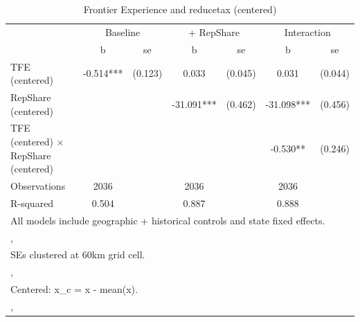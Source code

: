\begin{table}[htbp]\centering
\def\sym#1{\ifmmode^{#1}\else\(^{#1}\)\fi}
\caption{Frontier Experience and reducetax (centered)}
\begin{tabular}{l*{3}{cc}}
\toprule
                &\multicolumn{2}{c}{Baseline}&\multicolumn{2}{c}{ + RepShare}&\multicolumn{2}{c}{Interaction}\\
                &        b   &       se&        b   &       se&        b   &       se\\
\midrule
TFE (centered)  &   -0.514***&  (0.123)&    0.033   &  (0.045)&    0.031   &  (0.044)\\
RepShare (centered)&            &         &  -31.091***&  (0.462)&  -31.098***&  (0.456)\\
TFE (centered) $\times$ RepShare (centered)&            &         &            &         &   -0.530** &  (0.246)\\
\midrule
Observations    &     2036   &         &     2036   &         &     2036   &         \\
R-squared       &    0.504   &         &    0.887   &         &    0.888   &         \\
\bottomrule
\multicolumn{7}{l}{\footnotesize All models include geographic + historical controls and state fixed effects.}\\
\multicolumn{7}{l}{\footnotesize ,}\\
\multicolumn{7}{l}{\footnotesize SEs clustered at 60km grid cell.}\\
\multicolumn{7}{l}{\footnotesize ,}\\
\multicolumn{7}{l}{\footnotesize Centered: x\_c = x - mean(x).}\\
\multicolumn{7}{l}{\footnotesize ,}\\
\end{tabular}
\end{table}
